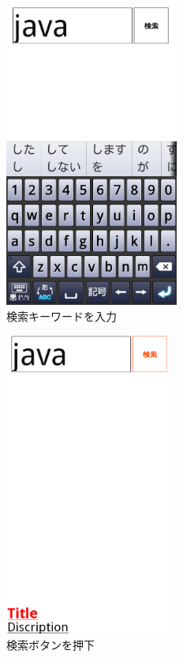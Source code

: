 \begin{figure}[htbp]
\begin{center}
\includegraphics[height=10cm]{eps/le02.eps}
\caption{検索キーワードを入力}
\label{le02}
\end{center}
\end{figure}

\begin{figure}[htbp]
\begin{center}
\includegraphics[height=10cm]{eps/le03.eps}
\caption{検索ボタンを押下}
\label{le03}
\end{center}
\end{figure}

